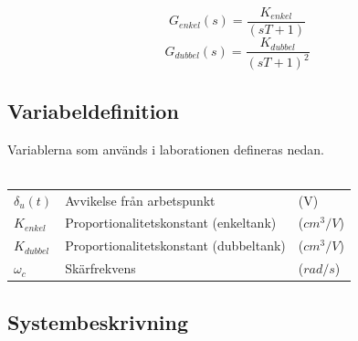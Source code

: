 \documentclass[a4paper]{article}
\begin{document}
\begin{equation}
  G_{enkel}(s)=\frac{K_{enkel}}{(sT+1)}
\end{equation}
\begin{equation}
  G_{dubbel}(s)=\frac{K_{dubbel}}{(sT+1)^2}
\end{equation}

\subsection{Variabeldefinition}

Variablerna som används i laborationen defineras nedan.
\\\\
\begin{tabular}{l l l}
  $\delta_{u}(t)$ & Avvikelse från arbetspunkt & (V) \\
  $K_{enkel}$ & Proportionalitetskonstant (enkeltank) & ($cm^3/V$) \\
  $K_{dubbel}$ & Proportionalitetskonstant (dubbeltank) & ($cm^3/V$) \\
  $\omega_c$ & Skärfrekvens & ($rad/s$)
\end{tabular}

\subsection{Systembeskrivning}
\end{document}
